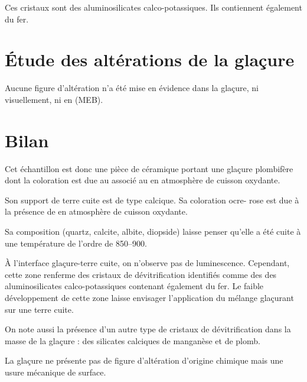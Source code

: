 Ces cristaux sont des aluminosilicates calco-potassiques. Ils 
contiennent également du fer.


\section{Étude des altérations de la glaçure}

Aucune figure d'altération n'a été mise en évidence dans la glaçure, 
ni visuellement, ni en \MEB[ie] (MEB).


\section{Bilan}

Cet échantillon est donc une pièce de céramique portant une glaçure 
plombifère dont la coloration  est due au  
associé au  en atmosphère de cuisson oxydante.

Son support de terre cuite est de type calcique. Sa coloration ocre-
rose est due à la présence de  en atmosphère de cuisson 
oxydante.

Sa composition \cristallo (quartz, calcite, albite, diopside) laisse penser qu'elle a été cuite à une température de l'ordre de \SIrange[range-phrase=\ à\ ]{850}{900}{\degC}.

À l'interface glaçure-terre cuite, on n'observe pas de luminescence. 
Cependant, cette zone renferme des cristaux de dévitrification 
identifiés comme des des aluminosilicates calco-potassiques contenant 
également du fer. Le faible développement de cette zone laisse 
envisager l'application du mélange glaçurant sur une terre cuite.

On note aussi la présence d'un autre type de cristaux de 
dévitrification dans la masse de la glaçure : des silicates calciques 
de manganèse et de plomb.

La glaçure ne présente pas de figure d'altération d'origine chimique 
mais une usure mécanique de surface.
